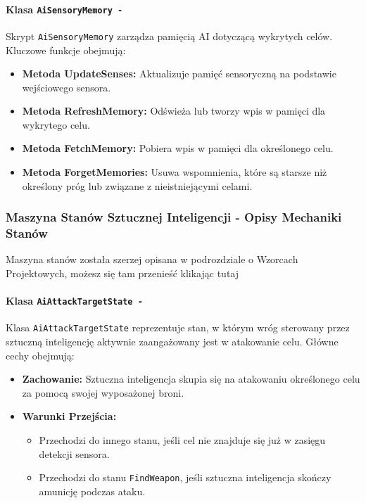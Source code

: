 \paragraph{Klasa \texttt{AiSensoryMemory -}}
Skrypt \texttt{AiSensoryMemory} zarządza pamięcią AI dotyczącą wykrytych celów. Kluczowe funkcje obejmują:
\begin{itemize}
  \item \textbf{Metoda UpdateSenses:} Aktualizuje pamięć sensoryczną na podstawie wejściowego sensora.
  \item \textbf{Metoda RefreshMemory:} Odświeża lub tworzy wpis w pamięci dla wykrytego celu.
  \item \textbf{Metoda FetchMemory:} Pobiera wpis w pamięci dla określonego celu.
  \item \textbf{Metoda ForgetMemories:} Usuwa wspomnienia, które są starsze niż określony próg lub związane z nieistniejącymi celami.
\end{itemize}

\subsubsection{Maszyna Stanów Sztucznej Inteligencji - Opisy Mechaniki Stanów}
Maszyna stanów została szerzej opisana w podrozdziale o Wzorcach Projektowych, możesz się tam przenieść klikając tutaj 
\paragraph{Klasa \texttt{AiAttackTargetState -}}
Klasa \texttt{AiAttackTargetState} reprezentuje stan, w którym wróg sterowany przez sztuczną inteligencję aktywnie zaangażowany jest w atakowanie celu. Główne cechy obejmują:
\begin{itemize}
  \item \textbf{Zachowanie:} Sztuczna inteligencja skupia się na atakowaniu określonego celu za pomocą swojej wyposażonej broni.
  \item \textbf{Warunki Przejścia:}
    \begin{itemize}
      \item Przechodzi do innego stanu, jeśli cel nie znajduje się już w zasięgu detekcji sensora.
      \item Przechodzi do stanu \texttt{FindWeapon}, jeśli sztuczna inteligencja skończy amunicję podczas ataku.
    \end{itemize}
\end{itemize}

